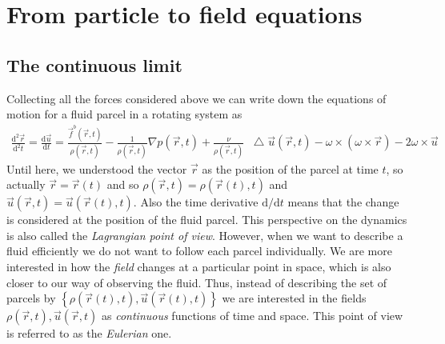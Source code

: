 \documentclass[10pt,a4paper]{article}
\newcommand*\Laplace{\mathop{}\!\mathbin\bigtriangleup}
\renewcommand{\d}{\mathrm{d}}
\begin{document}
\section{From particle to field equations}

\subsection{The continuous limit}

Collecting all the forces considered above we can write down the equations of motion for a fluid parcel in a rotating system as
%
\begin{align}
\frac{\d^2 \vec{r}}{\d^2 t} = \frac{\d \vec{u}}{\d t} = \frac{\vec{f}^b(\vec{r},t)}{\rho(\vec{r},t)} -\frac{1}{\rho(\vec{r},t)} \nabla p(\vec{r}, t)+ \frac{\nu}{\rho(\vec{r}, t)} \Laplace \vec{u}(\vec{r}, t) -  \omega \times (\omega \times \vec{r}) - 2 \omega \times \vec{u}
\end{align}
%
Until here, we understood the vector $\vec{r}$ as the position of the parcel at time $t$, so actually $\vec{r}=\vec{r}(t)$ and so $\rho(\vec{r},t)=\rho(\vec{r}(t),t)$ and $\vec{u}(\vec{r},t)=\vec{u}(\vec{r}(t),t)$.
%
Also the time derivative $\d / \d t$ means that the change is considered at the position of the fluid parcel.
%
This perspective on the dynamics is also called the \textit{Lagrangian point of view}.
%
However, when we want to describe a fluid efficiently we do not want to follow each parcel individually.
%
We are more interested in how the \textit{field} changes at a particular point in space, which is also closer to our way of observing the fluid.
%
Thus, instead of describing the set of parcels by $\left\{ \rho(\vec{r}(t), t), \vec{u}(\vec{r}(t), t)\right\}$ we are interested in the fields $\rho(\vec{r},t), \vec{u}(\vec{r},t)$ as \textit{continuous} functions of time and space.
%
This point of view is referred to as the \textit{Eulerian} one.
\end{document}
